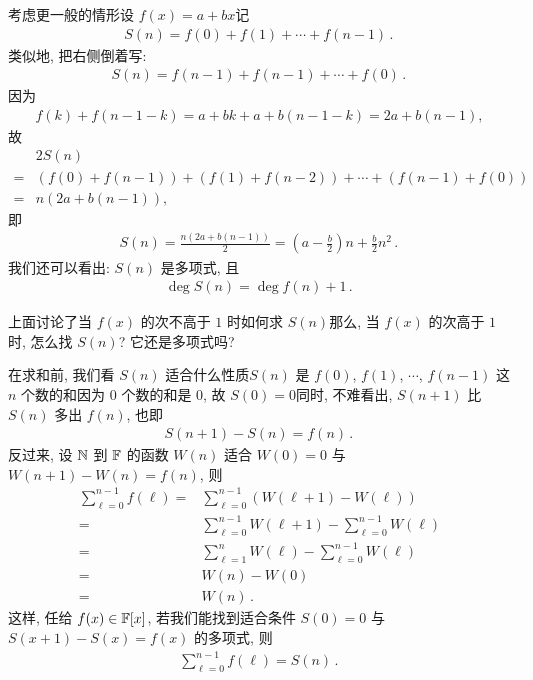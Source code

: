 \begin{example}
    考虑更一般的情形\period 设 $f(x) = a + bx$\period 记
    \begin{align*}
        S(n) = f(0) + f(1) + \cdots + f(n-1) \period
    \end{align*}
    类似地, 把右侧倒着写:
    \begin{align*}
        S(n) = f(n-1) + f(n-1) + \cdots + f(0) \period
    \end{align*}
    因为
    \begin{align*}
        f(k) + f(n-1-k) = a + bk + a + b(n-1-k) = 2a + b(n - 1),
    \end{align*}
    故
    \begin{align*}
             & 2S(n)                                                        \\
        = {} & (f(0) + f(n-1)) + (f(1) + f(n-2)) + \cdots + (f(n-1) + f(0)) \\
        = {} & n(2a + b(n - 1)),
    \end{align*}
    即
    \begin{align*}
        S(n) = \frac{n(2a + b(n - 1))}{2} = \left(a - \frac{b}{2}\right) n + \frac{b}{2} n^2 \period
    \end{align*}
    我们还可以看出: $S(n)$ 是多项式, 且
    \begin{align*}
        \deg S(n) = \deg f(n) + 1 \period
    \end{align*}
\end{example}

上面讨论了当 $f(x)$ 的次不高于 $1$ 时如何求 $S(n)$\period 那么, 当 $f(x)$ 的次高于 $1$ 时, 怎么找 $S(n)$? 它还是多项式吗?

在求和前, 我们看 $S(n)$ 适合什么性质\period $S(n)$ 是 $f(0)$, $f(1)$, $\cdots$, $f(n-1)$ 这 $n$ 个数的和\period 因为 $0$ 个数的和是 $0$, 故 $S(0) = 0$\period 同时, 不难看出, $S(n+1)$ 比 $S(n)$ 多出 $f(n)$, 也即
\begin{align*}
    S(n+1) - S(n) = f(n) \period
\end{align*}
反过来, 设 $\mathbb{N}$ 到 $\mathbb{F}$ 的函数 $W(n)$ 适合 $W(0) = 0$ 与 $W(n+1) - W(n) = f(n)$, 则
\begin{align*}
    \sum_{\ell = 0}^{n - 1} f(\ell)
    = {} & \sum_{\ell = 0}^{n - 1} (W(\ell+1) - W(\ell))                       \\
    = {} & \sum_{\ell = 0}^{n - 1} W(\ell+1) - \sum_{\ell = 0}^{n - 1} W(\ell) \\
    = {} & \sum_{\ell = 1}^{n} W(\ell) - \sum_{\ell = 0}^{n - 1} W(\ell)       \\
    = {} & W(n) - W(0)                                                         \\
    = {} & W(n) \period
\end{align*}
这样, 任给 $f(x) \in \mathbb{F}[x]$, 若我们能找到适合条件 $S(0) = 0$ 与 $S(x+1) - S(x) = f(x)$ 的多项式, 则
\begin{align*}
    \sum_{\ell = 0}^{n - 1} f(\ell) = S(n) \period
\end{align*}

